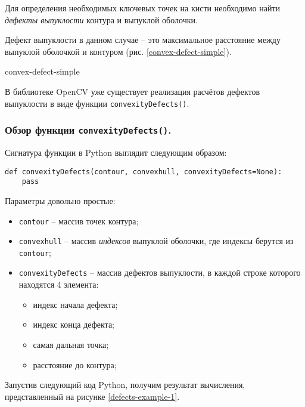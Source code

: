 Для определения необходимых ключевых точек на кисти необходимо 
найти {\it дефекты выпуклости} контура и выпуклой оболочки. 

Дефект выпуклости в данном случае -- это максимальное расстояние
между выпуклой оболочкой и контуром (рис. \ref{convex-defect-simple}).

{convex-defect-simple}


В библиотеке OpenCV уже существует реализация расчётов дефектов 
выпуклости в виде функции {\tt convexityDefects()}. 

\subsubsection{Обзор функции {\tt convexityDefects()}.}

Сигнатура функции в Python выглядит следующим образом:

\begin{verbatim}
def convexityDefects(contour, convexhull, convexityDefects=None):
	pass
\end{verbatim}

Параметры довольно простые:
\begin{itemize}
	\item {\tt contour} -- массив точек контура;
	\item {\tt convexhull} -- массив {\it индексов} выпуклой оболочки, 
где индексы берутся из {\tt contour};
	\item {\tt convexityDefects} -- массив дефектов выпуклости, в 
каждой строке которого находятся 4 элемента:
	\begin{itemize}
		\item индекс начала дефекта;
		\item индекс конца дефекта;
		\item самая дальная точка;
		\item расстояние до контура;
	\end{itemize}
\end{itemize}

Запустив следующий код Python, получим результат вычисления, 
представленный на рисунке \ref{defects-example-1}.

